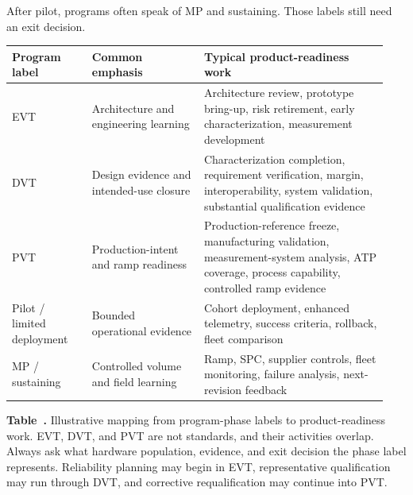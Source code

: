 
After pilot, programs often speak of
MP
and sustaining. Those labels still need an exit decision.

\begin{table}[ht]
\label{tab:phase-readiness-map}%
\centering
\setlength{\tabcolsep}{3pt}%
\footnotesize
\renewcommand{\arraystretch}{1.15}%
\begin{tabular}{@{}p{0.20\linewidth}p{0.28\linewidth}p{0.46\linewidth}@{}}
\toprule
Program label & Common emphasis & Typical product-readiness work \\
\midrule
EVT & Architecture and engineering learning & Architecture review, prototype
bring-up, risk retirement, early characterization, measurement development \\
\addlinespace[0.6em]
DVT & Design evidence and intended-use closure & Characterization completion,
requirement verification, margin, interoperability, system validation,
substantial qualification evidence \\
\addlinespace[0.6em]
PVT & Production-intent and ramp readiness & Production-reference freeze,
manufacturing validation, measurement-system analysis, ATP coverage, process
capability, controlled ramp evidence \\
\addlinespace[0.6em]
Pilot / limited deployment & Bounded operational evidence & Cohort deployment,
enhanced telemetry, success criteria, rollback, fleet comparison \\
\addlinespace[0.6em]
MP / sustaining & Controlled volume and field learning & Ramp, SPC, supplier
controls, fleet monitoring, failure analysis, next-revision feedback \\
\bottomrule
\end{tabular}
\par\medskip
{\raggedright\footnotesize\textbf{Table~\thetable.} Illustrative mapping from
program-phase labels to product-readiness work. EVT, DVT, and PVT are not
standards, and their activities overlap. Always ask what hardware population,
evidence, and exit decision the phase label represents. Reliability planning
may begin in EVT, representative qualification may run through DVT, and
corrective requalification may continue into PVT.\par}
\end{table}



